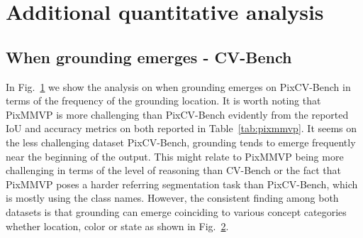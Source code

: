 \section{Additional quantitative analysis}
\subsection{When grounding emerges - CV-Bench}
In Fig.~\ref{fig:tokenlocnew} we show the analysis on when grounding emerges on PixCV-Bench in terms of the frequency of the grounding location. It is worth noting that PixMMVP is more challenging than PixCV-Bench evidently from the reported IoU and accuracy metrics on both reported in Table~\ref{tab:pixmmvp}. It seems on the less challenging dataset PixCV-Bench, grounding tends to emerge frequently near the beginning of the output. This might relate to PixMMVP being more challenging in terms of the level of reasoning than CV-Bench or the fact that PixMMVP poses a harder referring segmentation task than PixCV-Bench, which is mostly using the class names. However, the consistent finding among both datasets is that grounding can emerge coinciding to various concept categories whether location, color or state as shown in Fig.~\ref{fig:tokenconceptnew}. 

\begin{figure*}[h]
\centering
\begin{subfigure}{0.48\textwidth}

\vspace{-1em}
\caption{}
\label{fig:tokenlocnew}
\end{subfigure}%
\begin{subfigure}{0.52\textwidth}

\vspace{-1em}
\caption{}
\label{fig:tokenconceptnew}
\end{subfigure}
\vspace{-2em}
\caption{Analysis on when grounding emerges on PixCV-Bench benchmark using the three base MLLMs, Llava 1.5 (7, 13B) and Cambrian-1 (8B), that were not trained with pixel-level grounding supervision. We follow the second probing then report the oracle selection. Analysis on: (a) the output location and (b) the output concept category, that coincides with the best segmentation.}
\vspace{-0.5em}
\label{tab:When_CVBENCH}
\end{figure*}

